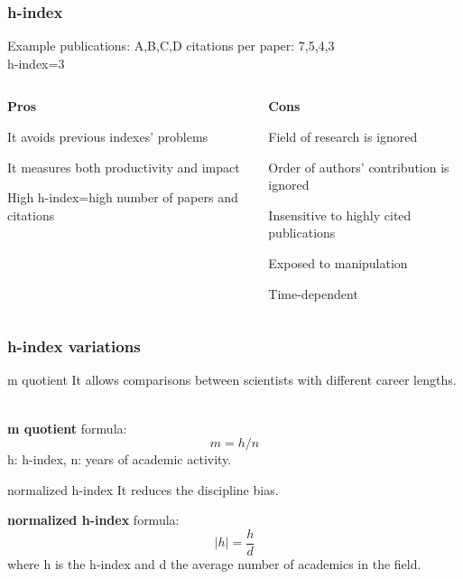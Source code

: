 \documentclass{beamer}
\begin{document}
\begin{frame}
    \frametitle{h-index}

    \begin{exampleblock}{Example}
         publications:   A,B,C,D \hspace{0.5cm}   citations per paper:  7,5,4,3\\
        \centering h-index=3

    \end{exampleblock}
    \begin{columns}[T]
        \begin{column}{.5\textwidth}
            \centering \textbf{Pros}
            \begin{propslist}
                \item It avoids previous indexes' problems
                \item It measures both productivity and impact
                \item High h-index=high number of papers and citations
            \end{propslist}
        \end{column}
        \begin{column}{.5\textwidth}
            \centering \textbf{Cons} %
            \begin{conslist}
                \item Field of research is ignored
                \item Order of authors' contribution is ignored
                \item Insensitive to highly cited publications
                \item Exposed to manipulation
                \item Time-dependent
            \end{conslist}
        \end{column}
    \end{columns}

\end{frame}
\begin{frame}
    \frametitle{h-index variations}
    \begin{block}{m quotient}
        It allows comparisons between scientists with different career lengths.
    \end{block}\\
    \textbf{m quotient} formula:
    \[
        m = h/n
    \]
   \centering h: h-index, n: years of academic activity.

    \begin{block}{normalized h-index}
        It reduces the discipline bias.
    \end{block}
    \textbf{normalized h-index} formula:
    \[
      |h|=\frac{h}{d}
    \] where \centering h is the h-index and d the average number of academics in the field.
\end{frame}
\end{document}
